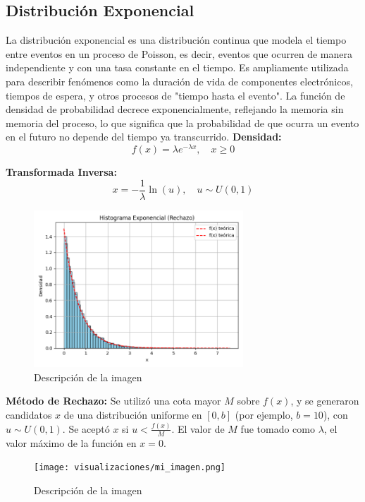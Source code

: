 \documentclass{article}
\begin{document}
\subsection{Distribución Exponencial}
La distribución exponencial es una distribución continua que modela el tiempo entre eventos en un proceso de Poisson, es decir, eventos que ocurren de manera independiente y con una tasa constante en el tiempo. Es ampliamente utilizada para describir fenómenos como la duración de vida de componentes electrónicos, tiempos de espera, y otros procesos de "tiempo hasta el evento". La función de densidad de probabilidad decrece exponencialmente, reflejando la memoria sin memoria del proceso, lo que significa que la probabilidad de que ocurra un evento en el futuro no depende del tiempo ya transcurrido.
\textbf{Densidad:}
\begin{equation}
f(x) = \lambda e^{-\lambda x}, \quad x \geq 0
\end{equation}

\textbf{Transformada Inversa:}
\begin{equation}
x = -\frac{1}{\lambda} \ln(u), \quad u \sim U(0,1)
\end{equation}
\begin{figure}[H] %
    \centering
    \includegraphics[width=0.7\textwidth]{visualizaciones/exponencial_Rechazo.png}
    \caption{Descripción de la imagen}
    \label{fig:mi_imagen}
\end{figure}


\textbf{Método de Rechazo:} Se utilizó una cota mayor $M$ sobre $f(x)$, y se generaron candidatos $x$ de una distribución uniforme en $[0, b]$ (por ejemplo, $b = 10$), con $u \sim U(0,1)$. Se aceptó $x$ si $u < \frac{f(x)}{M}$. El valor de $M$ fue tomado como $\lambda$, el valor máximo de la función en $x=0$.
\begin{figure}[H] %
    \centering
    \texttt{[image: visualizaciones/mi\_imagen.png]}
    \caption{Descripción de la imagen}
    \label{fig:mi_imagen}
\end{figure}
\end{document}
